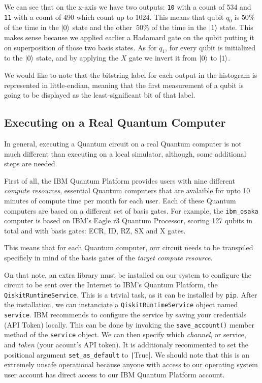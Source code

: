 We can see that on the x-axis we have two outputs: \verb|10| with a count of 534 and \verb|11| with a count
of 490 which count up to 1024. This means that qubit $q_0$ is $50\%$ of the time in the $\ket{0}$ state and
the other $~50\%$ of the time in the $\ket{1}$ state. This makes sense because we applied earlier a Hadamard
gate on the qubit putting it on superposition of those two basis states. As for $q_1$, for every qubit is initialized
to the $\ket{0}$ state, and by applying the $X$ gate we invert it from $\ket{0}$ to $\ket{1}$.

We would like to note that the bitstring label for each output in the histogram is represented in little-endian,
meaning that the first measurement of a qubit is going to be displayed as the least-significant bit of that label.

\subsection{Executing on a Real Quantum Computer}

In general, executing a Quantum circuit on a real Quantum computer is not much different than executing on a local
simulator, although, some additional steps are needed.

First of all, the IBM Quantum Platform provides users with nine different \textit{compute resources}, essential
Quantum computers that are avalaible for upto 10 minutes of compute time per month for each user. Each of these
Quantum computers are based on a different set of basis gates. For example, the \verb|ibm_osaka| computer
is based on IBM's Eagle r3 Quantum Processor, scoring 127 qubits in total and with basis gates: ECR, ID, RZ, SX
and X gates.

This means that for each Quantum computer, our circuit needs to be transpiled specificly in mind of the basis gates
of the \textit{target compute resource}.

On that note, an extra library must be installed on our system to configure the circuit to
be sent over the Internet to IBM's Quantum Platform, the \verb|QiskitRuntimeService|. This
is a trivial task, as it can be installed by \verb|pip|. After the installation, we can
instanciate a \verb|QiskitRuntimeService| object named \verb|service|. IBM recommends to
configure the service by saving your credentials (API Token) locally. This can be done by
invoking the \verb|save_account()| member method of the \verb|service| object. We can then
specify which \textit{channel}, or service, and \textit{token} (your acount's API token).
It is additionaly recommented to set the positional argument \verb|set_as_default| to
\texttt|True|. We should note that this is an extremely unsafe operational
because anyone with access to our operating system user account has direct access to our
IBM Quantum Platform account.

